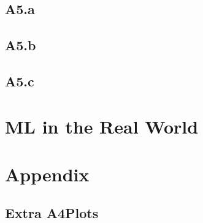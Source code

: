 \documentclass[]{article}
\begin{document}
    \subsection*{A5.a}
        
    \subsection*{A5.b}
        
    \subsection*{A5.c}
        
\section*{ML in the Real World}


\section*{Appendix}
    \subsection*{Extra A4Plots}
\end{document}
